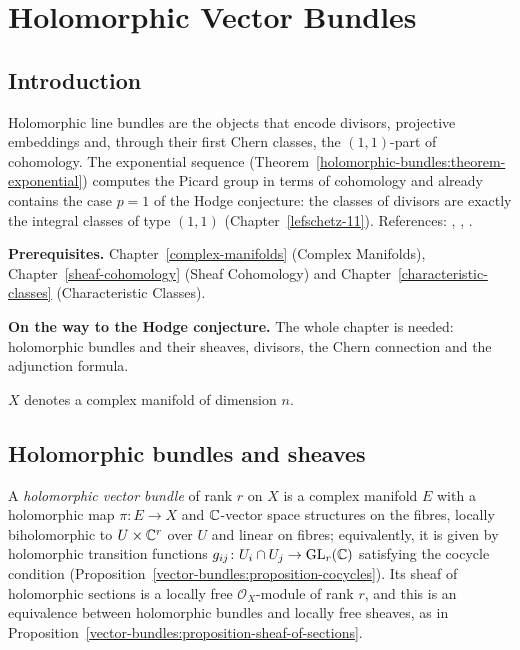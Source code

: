 \chapter{Holomorphic Vector Bundles}\label{holomorphic-bundles}

\section{Introduction}\label{holomorphic-bundles:section-introduction}

Holomorphic line bundles are the objects that encode divisors, projective embeddings and, through their first Chern classes, the
$(1,1)$-part of cohomology. The exponential sequence (Theorem~\ref{holomorphic-bundles:theorem-exponential}) computes the Picard
group in terms of cohomology and already contains the case $p = 1$ of the Hodge conjecture: the classes of divisors are exactly the
integral classes of type $(1,1)$ (Chapter~\ref{lefschetz-11}). References: \cite[Chapter 1]{griffiths-harris},
\cite[Chapters 2--4]{huybrechts-complex}, \cite[Chapter 4]{voisin-hodge-1}.

\noindent\textbf{Prerequisites.} Chapter~\ref{complex-manifolds} (Complex Manifolds), Chapter~\ref{sheaf-cohomology} (Sheaf
Cohomology) and Chapter~\ref{characteristic-classes} (Characteristic Classes).

\noindent\textbf{On the way to the Hodge conjecture.} The whole chapter is needed: holomorphic bundles and their sheaves, divisors, the Chern connection and the adjunction formula.

$X$ denotes a complex manifold of dimension $n$.

\section{Holomorphic bundles and sheaves}\label{holomorphic-bundles:section-bundles}

\begin{definition}\label{holomorphic-bundles:definition-holomorphic-bundle}
A \emph{holomorphic vector bundle} of rank $r$ on $X$ is a complex manifold $E$ with a holomorphic map $\pi \colon E \to X$ and $\mathbb{C}$-vector space structures on the fibres, locally biholomorphic to
$U \times \mathbb{C}^r$ over $U$ and linear on fibres; equivalently, it is given by holomorphic transition functions $g_{ij} \colon U_i \cap U_j \to \mathrm{GL}_r(\mathbb{C})$ satisfying the cocycle condition
(Proposition~\ref{vector-bundles:proposition-cocycles}). Its sheaf of holomorphic sections is a locally free $\mathcal{O}_X$-module of rank $r$, and this is an equivalence between holomorphic bundles and
locally free sheaves, as in Proposition~\ref{vector-bundles:proposition-sheaf-of-sections}.
\end{definition}

